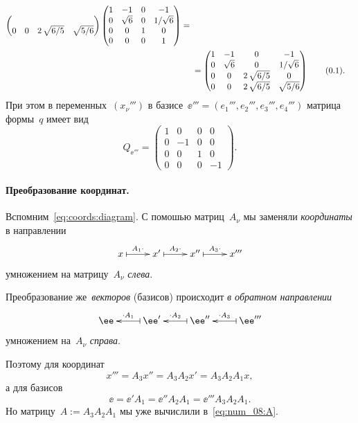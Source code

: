 \begin{solution}
\begin{align*}
\begin{pmatrix}
			\\
			0 & 0 & 2\,\sqrt{6/5} & \sqrt{5/6}
		\end{pmatrix}
		\begin{pmatrix}
			1 & -1 & 0 & -1
			\\
			0 & \sqrt{6} & 0 & 1/\sqrt{6}
			\\
			0 & 0 & 1 & 0
			\\
			0 & 0 & 0 & 1
		\end{pmatrix}
		\nlinea{=}
		\begin{pmatrix}
			1 & -1 & 0 & -1
			\\
			0 & \sqrt{6} & 0 & 1/\sqrt{6}
			\\
			0 & 0 & 2\,\sqrt{6/5} & 0
			\\
			0 & 0 & 2\,\sqrt{6/5} & \sqrt{5/6}
		\end{pmatrix}
		\refstepcounter{equation}
		\tag{\theequation}
		\label{eq:num_08:A}
		.
	\end{align*}
	При этом в переменных~$(x_\nu''')$ в базисе~$\ee''' = (e_1''', e_2''', e_3''', e_4''')$ матрица формы~$q$ имеет вид
	\begin{equation}
		\label{eq:num_08:Qs}
		Q_{\ee'''} =
		\begin{pmatrix}
			1 & 0 & 0 & 0
			\\
			0 & -1 & 0 & 0 
			\\
			0 & 0 & 1 & 0
			\\
			0 & 0 & 0 & -1
		\end{pmatrix}
		.
	\end{equation}

	\paragraph{Преобразование координат.}

	Вспомним~\eqref{eq:coords:diagram}.
	С помошью матриц~$A_\nu$ мы заменяли \emph{координаты} в направлении
	\[
		\xymatrix{
			x
			\ar @{|->} [r] ^-{A_1 \cdot}
			&
			x'
			\ar @{|->} [r] ^-{A_2 \cdot}
			&
			x''
			\ar @{|->} [r] ^-{A_3 \cdot}
			&
			x'''
		}
	\]
	умножением на матрицу~$A_\nu$ \emph{слева}.

	Преобразование же~\emph{векторов} (базисов) происходит \emph{в обратном направлении}
	\[
		\xymatrix{
			\ee
			\ar @{<-|} [r] ^-{\cdot A_1}
			&
			\ee'
			\ar @{<-|} [r] ^-{\cdot A_2}
			&
			\ee''
			\ar @{<-|} [r] ^-{\cdot A_3}
			&
			\ee'''
		}
	\]
	умножением на~$A_\nu$ \emph{справа}.

	Поэтому для координат
	\[
		x''' = A_3x'' = A_3 A_2 x' = A_3 A_2 A_1 x
		,
	\]
	а для базисов
	\[
		\ee =
		\ee' A_1 =
		\ee'' A_2 A_1 =
		\ee''' A_3 A_2 A_1
		.
	\]
	Но матрицу~$A := A_3 A_2 A_1$ мы уже вычислили в~\eqref{eq:num_08:A}.


\end{solution}
